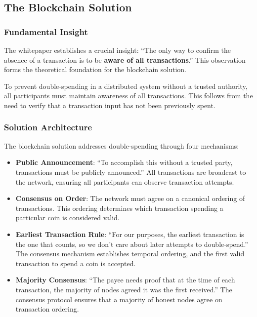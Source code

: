 \subsection{The Blockchain Solution}
\label{subsec:blockchain-solution}

\subsubsection{Fundamental Insight}

The whitepaper establishes a crucial insight: ``The only way to confirm the absence of a transaction is to be \textbf{aware of all transactions}.'' This observation forms the theoretical foundation for the blockchain solution.

To prevent double-spending in a distributed system without a trusted authority, all participants must maintain awareness of all transactions. This follows from the need to verify that a transaction input has not been previously spent.

\subsubsection{Solution Architecture}

The blockchain solution addresses double-spending through four mechanisms:

\begin{itemize}
  \item \textbf{Public Announcement}: ``To accomplish this without a trusted party, transactions must be publicly announced.'' All transactions are broadcast to the network, ensuring all participants can observe transaction attempts.

  \item \textbf{Consensus on Order}: The network must agree on a canonical ordering of transactions. This ordering determines which transaction spending a particular coin is considered valid.

  \item \textbf{Earliest Transaction Rule}: ``For our purposes, the earliest transaction is the one that counts, so we don't care about later attempts to double-spend.'' The consensus mechanism establishes temporal ordering, and the first valid transaction to spend a coin is accepted.

  \item \textbf{Majority Consensus}: ``The payee needs proof that at the time of each transaction, the majority of nodes agreed it was the first received.'' The consensus protocol ensures that a majority of honest nodes agree on transaction ordering.
\end{itemize}

